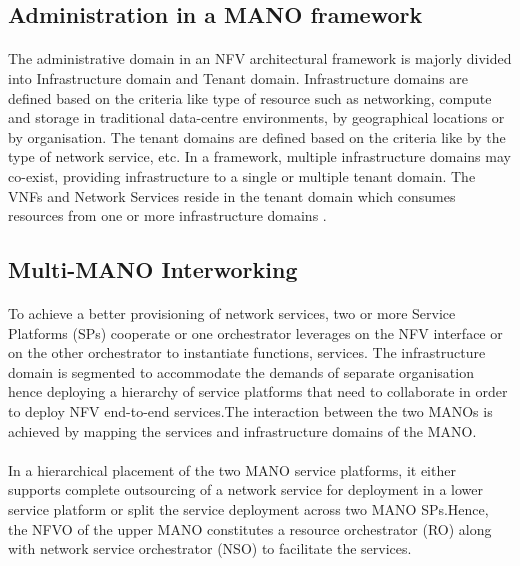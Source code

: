 \subsection{Administration in a MANO framework}

\paragraph{}The administrative domain in an NFV architectural framework is majorly divided into Infrastructure domain and Tenant domain. Infrastructure domains are defined based on the criteria like type of resource such as networking, compute and storage in traditional data-centre environments, by geographical locations or by organisation. The tenant domains are defined based on the criteria like by the type of network service, etc. In a framework, multiple infrastructure domains may co-exist, providing infrastructure to a single or multiple tenant domain. The VNFs and Network Services reside in the tenant domain which consumes resources from one or more infrastructure domains \cite{peinetwork}.

\subsection{Multi-MANO Interworking}
\paragraph{}To achieve a better provisioning of network services, two or more Service Platforms (SPs) cooperate or one orchestrator leverages on the NFV interface or on the other orchestrator to instantiate functions, services. The infrastructure domain is segmented to accommodate the demands of separate organisation hence deploying a hierarchy of service platforms that need to collaborate in order to deploy NFV end-to-end services.The interaction between the two MANOs is achieved by mapping the services and infrastructure domains of the MANO. 

\paragraph{}In a hierarchical placement of the two MANO service platforms, it either supports complete outsourcing of a network service for deployment in a lower service platform or split the service deployment across two MANO SPs.Hence, the NFVO of the upper MANO constitutes a resource orchestrator (RO) along with network service orchestrator (NSO) to facilitate the services.




